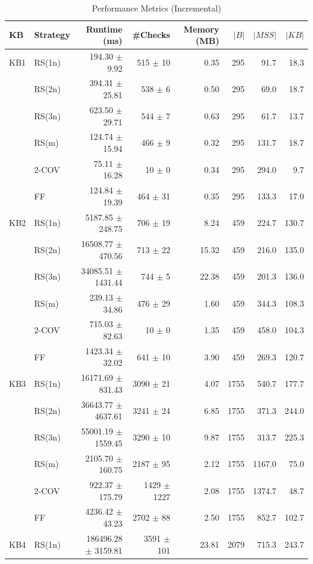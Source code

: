 \begin{table}[htbp]
\centering
\caption{Performance Metrics (Incremental)}
\label{tab:performance_incremental}
\begin{tabular}{llrrrrrr}
\toprule
KB & Strategy & Runtime (ms) & \#Checks & Memory (MB) & $|B|$ & $|MSS|$ & $|KB|$ \\
\midrule
KB1 & RS(1n) & 194.30 $\pm$ 9.92 & 515 $\pm$ 10 & 0.35 & 295 & 91.7 & 18.3 \\
 & RS(2n) & 394.31 $\pm$ 25.81 & 538 $\pm$ 6 & 0.50 & 295 & 69.0 & 18.7 \\
 & RS(3n) & 623.50 $\pm$ 29.71 & 544 $\pm$ 7 & 0.63 & 295 & 61.7 & 13.7 \\
 & RS(m) & 124.74 $\pm$ 15.94 & 466 $\pm$ 9 & 0.32 & 295 & 131.7 & 18.7 \\
 & 2-COV & 75.11 $\pm$ 16.28 & 10 $\pm$ 0 & 0.34 & 295 & 294.0 & 9.7 \\
 & FF & 124.84 $\pm$ 19.39 & 464 $\pm$ 31 & 0.35 & 295 & 133.3 & 17.0 \\
\midrule
KB2 & RS(1n) & 5187.85 $\pm$ 248.75 & 706 $\pm$ 19 & 8.24 & 459 & 224.7 & 130.7 \\
 & RS(2n) & 16508.77 $\pm$ 470.56 & 713 $\pm$ 22 & 15.32 & 459 & 216.0 & 135.0 \\
 & RS(3n) & 34085.51 $\pm$ 1431.44 & 744 $\pm$ 5 & 22.38 & 459 & 201.3 & 136.0 \\
 & RS(m) & 239.13 $\pm$ 34.86 & 476 $\pm$ 29 & 1.60 & 459 & 344.3 & 108.3 \\
 & 2-COV & 715.03 $\pm$ 82.63 & 10 $\pm$ 0 & 1.35 & 459 & 458.0 & 104.3 \\
 & FF & 1423.34 $\pm$ 32.02 & 641 $\pm$ 10 & 3.90 & 459 & 269.3 & 120.7 \\
\midrule
KB3 & RS(1n) & 16171.69 $\pm$ 831.43 & 3090 $\pm$ 21 & 4.07 & 1755 & 540.7 & 177.7 \\
 & RS(2n) & 36643.77 $\pm$ 4637.61 & 3241 $\pm$ 24 & 6.85 & 1755 & 371.3 & 244.0 \\
 & RS(3n) & 55001.19 $\pm$ 1559.45 & 3290 $\pm$ 10 & 9.87 & 1755 & 313.7 & 225.3 \\
 & RS(m) & 2105.70 $\pm$ 160.75 & 2187 $\pm$ 95 & 2.12 & 1755 & 1167.0 & 75.0 \\
 & 2-COV & 922.37 $\pm$ 175.79 & 1429 $\pm$ 1227 & 2.08 & 1755 & 1374.7 & 48.7 \\
 & FF & 4236.42 $\pm$ 43.23 & 2702 $\pm$ 88 & 2.50 & 1755 & 852.7 & 102.7 \\
\midrule
KB4 & RS(1n) & 186496.28 $\pm$ 3159.81 & 3591 $\pm$ 101 & 23.81 & 2079 & 715.3 & 243.7 \\

\end{tabular}
\end{table}
